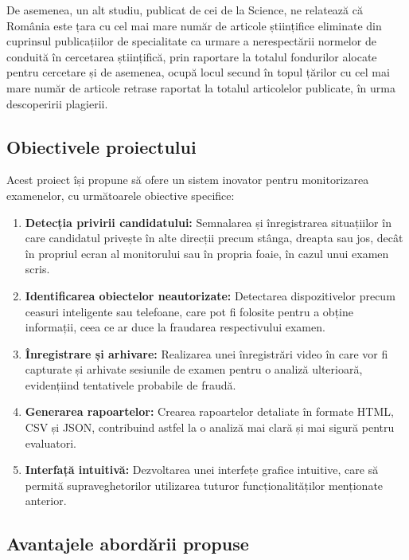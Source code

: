 \documentclass[12pt,a4paper]{article}
\begin{document}
De asemenea, un alt studiu\cite{science}, publicat de cei de la Science, ne
relatează că România este țara cu cel mai mare număr de articole
științifice eliminate din cuprinsul publicațiilor de specialitate ca
urmare a nerespectării normelor de conduită în cercetarea științifică,
prin raportare la totalul fondurilor alocate pentru cercetare și de
asemenea, ocupă locul secund în topul țărilor cu cel mai mare număr de
articole retrase raportat la totalul articolelor publicate, în urma
descoperirii plagierii.

\subsection{Obiectivele proiectului}

Acest proiect își propune să ofere un sistem inovator pentru monitorizarea examenelor, cu următoarele obiective specifice:

\begin{enumerate}[label=\arabic*.]
    \item \textbf{Detecția privirii candidatului:} Semnalarea și înregistrarea situațiilor
    în care candidatul privește în alte direcții precum stânga, dreapta sau jos, 
    decât în propriul ecran al monitorului sau în propria foaie, în cazul unui examen scris.
    
    \item \textbf{Identificarea obiectelor neautorizate:} Detectarea dispozitivelor precum
    ceasuri inteligente sau telefoane, care pot fi folosite pentru a obține informații, 
    ceea ce ar duce la fraudarea respectivului examen.
    
    \item \textbf{Înregistrare și arhivare:} Realizarea unei înregistrări video în care 
    vor fi capturate și arhivate sesiunile de examen pentru o analiză ulterioară, 
    evidențiind tentativele probabile de fraudă.
    
    \item \textbf{Generarea rapoartelor:} Crearea rapoartelor detaliate în formate HTML, CSV și JSON,
    contribuind astfel la o analiză mai clară și mai sigură pentru evaluatori.
    
    \item \textbf{Interfață intuitivă:} Dezvoltarea unei interfețe grafice intuitive, care să permită
    supraveghetorilor utilizarea tuturor funcționalităților menționate anterior.
\end{enumerate}

\subsection{Avantajele abordării propuse}
\end{document}
